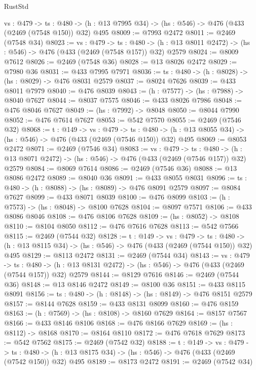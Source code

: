 \begin{lexlean}{RustStd}
\begin{coremodule}
  {vs : @479} ->
  {ts : @480} -> (h : @13 @7995 @34) -> (hs : @546) -> @476 (@433 (@2469 (@7548 @150)) @32) @495
@8009 := @7993 @2472
@8011 := @2469 (@7548 @34)
@8023 := {vs : @479} ->
  {ts : @480} -> (h : @13 @8011 @2472) -> (hs : @546) -> @476 (@433 (@2469 (@7548 @157)) @32) @2579
@8024 := @8009 @7612
@8026 := @2469 (@7548 @36)
@8028 := @13 @8026 @2472
@8029 := @7980 @36
@8031 := @433 @7995 @7971
@8036 := {ts : @480} -> (h : @8028) -> (hs : @8029) -> @476 @8031 @2579
@8037 := @8024 @7626
@8039 := @433 @8011 @7979
@8040 := @476 @8039
@8043 := (h : @7577) -> (hs : @7988) -> @8040 @7627
@8044 := @8037 @7575
@8046 := @433 @8026 @7986
@8048 := @476 @8046 @7627
@8049 := (hs : @7992) -> @8048
@8050 := @8044 @7990
@8052 := @476 @7614 @7627
@8053 := @542 @7570
@8055 := @2469 (@7546 @32)
@8068 := {t : @149} ->
  {vs : @479} ->
  {ts : @480} -> (h : @13 @8055 @34) -> (hs : @546) -> @476 (@433 (@2469 (@7546 @150)) @32) @495
@8069 := @8053 @2472
@8071 := @2469 (@7546 @34)
@8083 := {vs : @479} ->
  {ts : @480} -> (h : @13 @8071 @2472) -> (hs : @546) -> @476 (@433 (@2469 (@7546 @157)) @32) @2579
@8084 := @8069 @7614
@8086 := @2469 (@7546 @36)
@8088 := @13 @8086 @2472
@8089 := @8040 @36
@8091 := @433 @8055 @8031
@8096 := {ts : @480} -> (h : @8088) -> (hs : @8089) -> @476 @8091 @2579
@8097 := @8084 @7627
@8099 := @433 @8071 @8039
@8100 := @476 @8099
@8103 := (h : @7573) -> (hs : @8048) -> @8100 @7628
@8104 := @8097 @7571
@8106 := @433 @8086 @8046
@8108 := @476 @8106 @7628
@8109 := (hs : @8052) -> @8108
@8110 := @8104 @8050
@8112 := @476 @7616 @7628
@8113 := @542 @7566
@8115 := @2469 (@7544 @32)
@8128 := {t : @149} ->
  {vs : @479} ->
  {ts : @480} -> (h : @13 @8115 @34) -> (hs : @546) -> @476 (@433 (@2469 (@7544 @150)) @32) @495
@8129 := @8113 @2472
@8131 := @2469 (@7544 @34)
@8143 := {vs : @479} ->
  {ts : @480} -> (h : @13 @8131 @2472) -> (hs : @546) -> @476 (@433 (@2469 (@7544 @157)) @32) @2579
@8144 := @8129 @7616
@8146 := @2469 (@7544 @36)
@8148 := @13 @8146 @2472
@8149 := @8100 @36
@8151 := @433 @8115 @8091
@8156 := {ts : @480} -> (h : @8148) -> (hs : @8149) -> @476 @8151 @2579
@8157 := @8144 @7628
@8159 := @433 @8131 @8099
@8160 := @476 @8159
@8163 := (h : @7569) -> (hs : @8108) -> @8160 @7629
@8164 := @8157 @7567
@8166 := @433 @8146 @8106
@8168 := @476 @8166 @7629
@8169 := (hs : @8112) -> @8168
@8170 := @8164 @8110
@8172 := @476 @7618 @7629
@8173 := @542 @7562
@8175 := @2469 (@7542 @32)
@8188 := {t : @149} ->
  {vs : @479} ->
  {ts : @480} -> (h : @13 @8175 @34) -> (hs : @546) -> @476 (@433 (@2469 (@7542 @150)) @32) @495
@8189 := @8173 @2472
@8191 := @2469 (@7542 @34)

\end{coremodule}
\end{lexlean}
